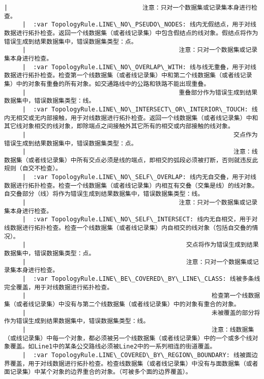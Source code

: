 \documentclass[11pt]{article}
\begin{document}
\begin{Verbatim}[commandchars=\\\{\}]
     |                                     注意：只对一个数据集或记录集本身进行检查。
     |  :var TopologyRule.LINE\_NO\_PSEUDO\_NODES: 线内无假结点，用于对线数据进行拓扑检查。返回一个线数据集（或者线记录集）中包含假结点的线对象。假结点将作为错误生成到结果数据集中，错误数据集类型：点。
     |                                          注意：只对一个数据集或记录集本身进行检查。
     |  :var TopologyRule.LINE\_NO\_OVERLAP\_WITH: 线与线无重叠，用于对线数据进行拓扑检查。检查第一个线数据集（或者线记录集）中和第二个线数据集（或者线记录集）中的对象有重叠的所有对象。如交通路线中的公路和铁路不能出现重叠。
     |                                          重叠部分作为错误生成到结果数据集中，错误数据集类型：线。
     |  :var TopologyRule.LINE\_NO\_INTERSECT\_OR\_INTERIOR\_TOUCH: 线内无相交或无内部接触，用于对线数据进行拓扑检查。返回一个线数据集（或者线记录集）中和其它线对象相交的线对象，即除端点之间接触外其它所有的相交或内部接触的线对象。
     |                                                         交点作为错误生成到结果数据集中，错误数据集类型：点。
     |                                                         注意：线数据集（或者线记录集）中所有交点必须是线的端点，即相交的弧段必须被打断，否则就违反此规则（自交不检查）。
     |  :var TopologyRule.LINE\_NO\_SELF\_OVERLAP: 线内无自交叠，用于对线数据进行拓扑检查。检查一个线数据集（或者线记录集）内相互有交叠（交集是线）的线对象。自交叠部分（线）将作为错误生成到结果数据集中，错误数据集类型：线。
     |                                          注意：只对一个数据集或记录集本身进行检查。
     |  :var TopologyRule.LINE\_NO\_SELF\_INTERSECT: 线内无自相交，用于对线数据进行拓扑检查。检查一个线数据集（或者线记录集）内自相交的线对象（包括自交叠的情况）。
     |                                            交点将作为错误生成到结果数据集中，错误数据集类型：点。
     |                                            注意：只对一个数据集或记录集本身进行检查。
     |  :var TopologyRule.LINE\_BE\_COVERED\_BY\_LINE\_CLASS: 线被多条线完全覆盖，用于对线数据进行拓扑检查。
     |                                                   检查第一个线数据集（或者线记录集）中没有与第二个线数据集（或者线记录集）中的对象有重合的对象。
     |                                                   未被覆盖的部分将作为错误生成到结果数据集中，错误数据集类型：线。
     |                                                   注意：线数据集（或线记录集）中每一个对象，都必须被另一个线数据集（或者线记录集）中的一个或多个线对象覆盖。如Line1中的某条公交路线必须被Line2中的一系列相连的街道覆盖。
     |  :var TopologyRule.LINE\_COVERED\_BY\_REGION\_BOUNDARY: 线被面边界覆盖，用于对线数据进行拓扑检查。检查线数据集（或者线记录集）中没有与面数据集（或者面记录集）中某个对象的边界重合的对象。（可被多个面的边界覆盖）。

\end{Verbatim}
\end{document}
